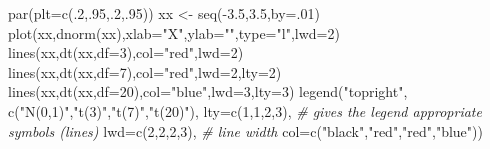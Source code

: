 \documentclass[
]{book}
\newenvironment{Shaded}{\begin{snugshade}}{\end{snugshade}}
\newcommand{\AttributeTok}[1]{\textcolor[rgb]{0.77,0.63,0.00}{#1}}
\newcommand{\CommentTok}[1]{\textcolor[rgb]{0.56,0.35,0.01}{\textit{#1}}}
\newcommand{\DecValTok}[1]{\textcolor[rgb]{0.00,0.00,0.81}{#1}}
\newcommand{\FloatTok}[1]{\textcolor[rgb]{0.00,0.00,0.81}{#1}}
\newcommand{\FunctionTok}[1]{\textcolor[rgb]{0.00,0.00,0.00}{#1}}
\newcommand{\NormalTok}[1]{#1}
\newcommand{\OtherTok}[1]{\textcolor[rgb]{0.56,0.35,0.01}{#1}}
\newcommand{\SpecialCharTok}[1]{\textcolor[rgb]{0.00,0.00,0.00}{#1}}
\newcommand{\StringTok}[1]{\textcolor[rgb]{0.31,0.60,0.02}{#1}}
\theoremstyle{definition}
\theoremstyle{definition}
\theoremstyle{definition}
\theoremstyle{definition}
\theoremstyle{remark}
\begin{document}
\begin{Shaded}
\begin{Highlighting}[]
\FunctionTok{par}\NormalTok{(}\AttributeTok{plt=}\FunctionTok{c}\NormalTok{(.}\DecValTok{2}\NormalTok{,.}\DecValTok{95}\NormalTok{,.}\DecValTok{2}\NormalTok{,.}\DecValTok{95}\NormalTok{))}
\NormalTok{xx }\OtherTok{\textless{}{-}} \FunctionTok{seq}\NormalTok{(}\SpecialCharTok{{-}}\FloatTok{3.5}\NormalTok{,}\FloatTok{3.5}\NormalTok{,}\AttributeTok{by=}\NormalTok{.}\DecValTok{01}\NormalTok{)}
\FunctionTok{plot}\NormalTok{(xx,}\FunctionTok{dnorm}\NormalTok{(xx),}\AttributeTok{xlab=}\StringTok{"X"}\NormalTok{,}\AttributeTok{ylab=}\StringTok{""}\NormalTok{,}\AttributeTok{type=}\StringTok{"l"}\NormalTok{,}\AttributeTok{lwd=}\DecValTok{2}\NormalTok{)}
\FunctionTok{lines}\NormalTok{(xx,}\FunctionTok{dt}\NormalTok{(xx,}\AttributeTok{df=}\DecValTok{3}\NormalTok{),}\AttributeTok{col=}\StringTok{"red"}\NormalTok{,}\AttributeTok{lwd=}\DecValTok{2}\NormalTok{)}
\FunctionTok{lines}\NormalTok{(xx,}\FunctionTok{dt}\NormalTok{(xx,}\AttributeTok{df=}\DecValTok{7}\NormalTok{),}\AttributeTok{col=}\StringTok{"red"}\NormalTok{,}\AttributeTok{lwd=}\DecValTok{2}\NormalTok{,}\AttributeTok{lty=}\DecValTok{2}\NormalTok{)}
\FunctionTok{lines}\NormalTok{(xx,}\FunctionTok{dt}\NormalTok{(xx,}\AttributeTok{df=}\DecValTok{20}\NormalTok{),}\AttributeTok{col=}\StringTok{"blue"}\NormalTok{,}\AttributeTok{lwd=}\DecValTok{3}\NormalTok{,}\AttributeTok{lty=}\DecValTok{3}\NormalTok{)}
\FunctionTok{legend}\NormalTok{(}\StringTok{"topright"}\NormalTok{,}
       \FunctionTok{c}\NormalTok{(}\StringTok{"N(0,1)"}\NormalTok{,}\StringTok{"t(3)"}\NormalTok{,}\StringTok{"t(7)"}\NormalTok{,}\StringTok{"t(20)"}\NormalTok{),}
       \AttributeTok{lty=}\FunctionTok{c}\NormalTok{(}\DecValTok{1}\NormalTok{,}\DecValTok{1}\NormalTok{,}\DecValTok{2}\NormalTok{,}\DecValTok{3}\NormalTok{), }\CommentTok{\# gives the legend appropriate symbols (lines)       }
       \AttributeTok{lwd=}\FunctionTok{c}\NormalTok{(}\DecValTok{2}\NormalTok{,}\DecValTok{2}\NormalTok{,}\DecValTok{2}\NormalTok{,}\DecValTok{3}\NormalTok{), }\CommentTok{\# line width}
       \AttributeTok{col=}\FunctionTok{c}\NormalTok{(}\StringTok{"black"}\NormalTok{,}\StringTok{"red"}\NormalTok{,}\StringTok{"red"}\NormalTok{,}\StringTok{"blue"}\NormalTok{))}
\end{Highlighting}
\end{Shaded}
\end{document}
